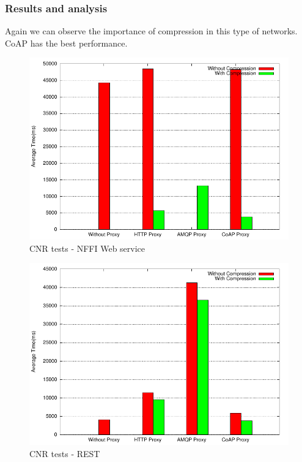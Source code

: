 \subsubsection{Results and analysis}

Again we can observe the importance of compression in this type of networks.
CoAP has the best performance.

\begin{figure}[H]
\center
\includegraphics[scale=0.75]{../results/cnr/nffi/result.pdf}
\caption{CNR tests - NFFI Web service}
\end{figure}

\begin{figure}[H]
\center
\includegraphics[scale=0.75]{../results/cnr/rest/result.pdf}
\caption{CNR tests - REST}
\end{figure}


